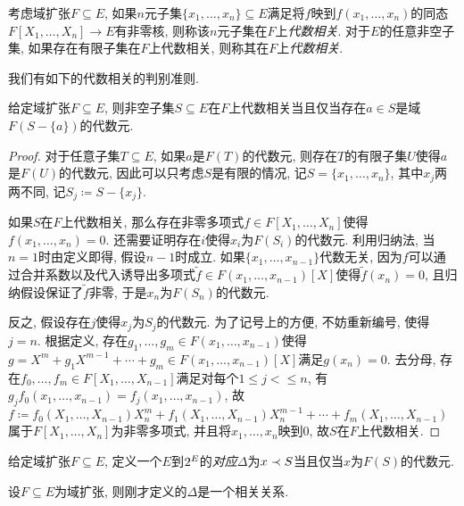 \begin{definition}
  考虑域扩张$F\subseteq E$, 如果$n$元子集$\{x_1, \dotsc, x_n\}\subseteq E$满足将$f$映到$f(x_1, \dotsc, x_n)$的同态$F[X_1, \dotsc, X_n]\to E$有非零核, 则称该$n$元子集在$F$上\emph{代数相关}. 对于$E$的任意非空子集, 如果存在有限子集在$F$上代数相关, 则称其在$F$上\emph{代数相关}.
\end{definition}

我们有如下的代数相关的判别准则.

\begin{proposition}\label{prop:algbdependcrit}
  给定域扩张$F\subseteq E$, 则非空子集$S\subseteq E$在$F$上代数相关当且仅当存在$a\in S$是域$F(S-\{a\})$的代数元.
\end{proposition}

\begin{proof}
  对于任意子集$T\subseteq E$, 如果$a$是$F(T)$的代数元, 则存在$T$的有限子集$U$使得$a$是$F(U)$的代数元, 因此可以只考虑$S$是有限的情况, 记$S=\{x_1, \dotsc, x_n\}$, 其中$x_j$两两不同, 记$S_j\coloneq S-\{x_j\}$.

  如果$S$在$F$上代数相关, 那么存在非零多项式$f\in F[X_1, \dotsc, X_n]$使得$f(x_1, \dotsc, x_n)=0$. 还需要证明存在$i$使得$x_i$为$F(S_i)$的代数元. 利用归纳法, 当$n=1$时由定义即得, 假设$n-1$时成立. 如果$\{x_1, \dotsc, x_{n-1}\}$代数无关, 因为$f$可以通过合并系数以及代入诱导出多项式$\tilde{f}\in F(x_1, \dotsc, x_{n-1})[X]$使得$\tilde{f}(x_n)=0$, 且归纳假设保证了$\tilde{f}$非零, 于是$x_n$为$F(S_n)$的代数元.

  反之, 假设存在$j$使得$x_j$为$S_j$的代数元. 为了记号上的方便, 不妨重新编号, 使得$j=n$. 根据定义, 存在$g_1, \dotsc, g_m\in F(x_1, \dotsc, x_{n-1})$使得$g=X^m+g_1X^{m-1}+\dotsb+g_m\in F(x_1, \dotsc, x_{n-1})[X]$满足$g(x_n)=0$. 去分母, 存在$f_0, \dotsc, f_m\in F[X_1, \dotsc, X_{n-1}]$满足对每个$1\leq j<\leq n$, 有$g_jf_0(x_1, \dotsc, x_{n-1})=f_j(x_1, \dotsc, x_{n-1})$, 故$f\coloneq f_0(X_1, \dotsc, X_{n-1})X_n^m+f_1(X_1, \dotsc, X_{n-1})X_n^{m-1}+\dotsb+f_m(X_1, \dotsc, X_{n-1})$属于$F[X_1, \dotsc, X_n]$为非零多项式, 并且将$x_1, \dotsc, x_n$映到0, 故$S$在$F$上代数相关.
\end{proof}

给定域扩张$F\subseteq E$, 定义一个$E$到$2^{E}$的\emph{对应}$\Delta$为$x\prec S$当且仅当$x$为$F(S)$的代数元.

\begin{proposition}\label{prop:algbdependcorr}
  设$F\subseteq E$为域扩张, 则刚才定义的$\Delta$是一个相关关系.
\end{proposition}

